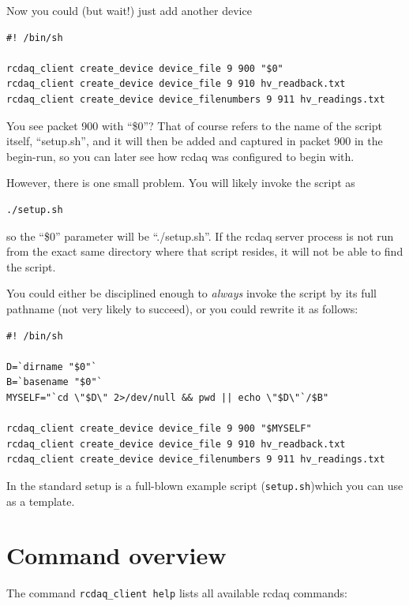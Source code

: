\documentclass{article}[11pt]
\begin{document}
Now you could (but wait!) just add another device

\begin{verbatim} 
#! /bin/sh

rcdaq_client create_device device_file 9 900 "$0" 
rcdaq_client create_device device_file 9 910 hv_readback.txt 
rcdaq_client create_device device_filenumbers 9 911 hv_readings.txt
\end{verbatim}

You see packet 900 with ``\$0''? That of course refers to the name of
the script itself, ``setup.sh'', and it will then be added and
captured in packet 900 in the begin-run, so you can later see how
rcdaq was configured to begin with.

However, there is one small problem. You will likely invoke the script as 

\begin{verbatim} 
./setup.sh
\end{verbatim}

so the ``\$0'' parameter will be ``./setup.sh''. If the rcdaq server
process is not run from the exact same directory where that script
resides, it will not be able to find the script.

You could either be disciplined enough to \emph{always} invoke the
script by its full pathname (not very likely to succeed), or you could
rewrite it as follows:

\begin{verbatim} 
#! /bin/sh

D=`dirname "$0"`
B=`basename "$0"`
MYSELF="`cd \"$D\" 2>/dev/null && pwd || echo \"$D\"`/$B"

rcdaq_client create_device device_file 9 900 "$MYSELF"
rcdaq_client create_device device_file 9 910 hv_readback.txt 
rcdaq_client create_device device_filenumbers 9 911 hv_readings.txt
\end{verbatim}

In the standard setup is a full-blown example script (\verb|setup.sh|)which you can use
as a template.


\section{Command overview}

The command \verb|rcdaq_client help| lists all available rcdaq commands:
\end{document}
